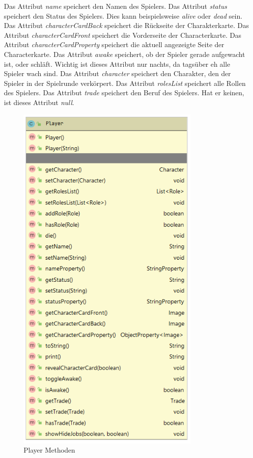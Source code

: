 Das Attribut \textit{name} speichert den Namen des Spielers. 
Das Attribut \textit{status} speichert den Status des Spielers. Dies kann beispielsweise \textit{alive} oder \textit{dead} sein. 
Das Attribut \textit{characterCardBack} speichert die Rückseite der Charakterkarte. 
Das Attribut \textit{characterCardFront} speichert die Vorderseite der Characterkarte. 
Das Attribut \textit{characterCardProperty} speichert die aktuell angezeigte Seite der Characterkarte. 
Das Attribut \textit{awake} speichert, ob der Spieler gerade aufgewacht ist, oder schläft. Wichtig ist dieses Attribut nur nachts, da tagsüber eh alle Spieler wach sind. 
Das Attribut \textit{character} speichert den Charakter, den der Spieler in der Spielrunde verkörpert. 
Das Attribut \textit{rolesList} speichert alle Rollen des Spielers. 
Das Attribut \textit{trade} speichert den Beruf des Spielers. Hat er keinen, ist dieses Attribut \textit{null}. 

\medskip
\begin{figure}
	\centering
	\includegraphics[width=9cm]{architektur/player_methods.png}
	\caption{Player Methoden}
	\label{figure:player_methods}
\end{figure}

